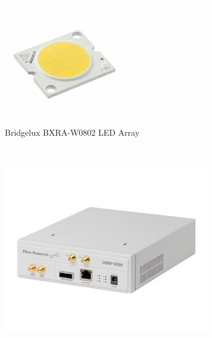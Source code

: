 \begin{figure}[!htb]
\centering
 \begin{subfigure}[h]{0.1\textwidth}
  \includegraphics[width=\textwidth]{fig/LED_array.jpg} 
  \caption{Bridgelux BXRA-W0802 LED Array} \label{fig:led_array}
 \end{subfigure}
~
 \begin{subfigure}[h]{0.1\textwidth}
  \includegraphics[width=\textwidth]{fig/usrp.jpg} 

\end{subfigure}
\end{figure}
